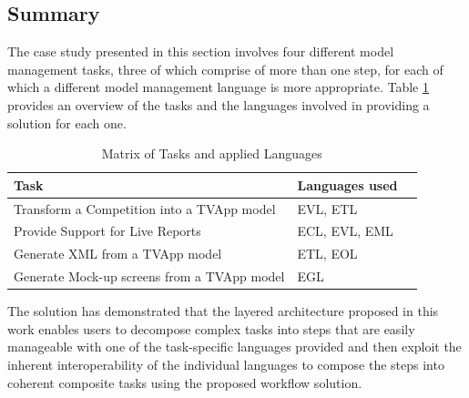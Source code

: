 \subsection{Summary}

The case study presented in this section involves four different model management tasks, three of which comprise of more than one step, for each of which a different model management language is more appropriate. Table \ref{tab:CaseStudyMatrix} provides an overview of the tasks and the languages involved in providing a solution for each one.

\begin{table}
	\centering
		\begin{tabular}{|l|l|l|}\hline
			\textbf{Task} & \textbf{Languages used} \\\hline
			Transform a Competition into a TVApp model & EVL, ETL \\\hline
			Provide Support for Live Reports & ECL, EVL, EML \\\hline
			Generate XML from a TVApp model & ETL, EOL \\\hline
			Generate Mock-up screens from a TVApp model & EGL \\\hline
		\end{tabular}
	\caption{Matrix of Tasks and applied Languages}
	\label{tab:CaseStudyMatrix}
\end{table}

The solution has demonstrated that the layered architecture proposed in this work enables users to decompose complex tasks into steps that are easily manageable with one of the task-specific languages provided and then exploit the inherent interoperability of the individual languages to compose the steps into coherent composite tasks using the proposed workflow solution.